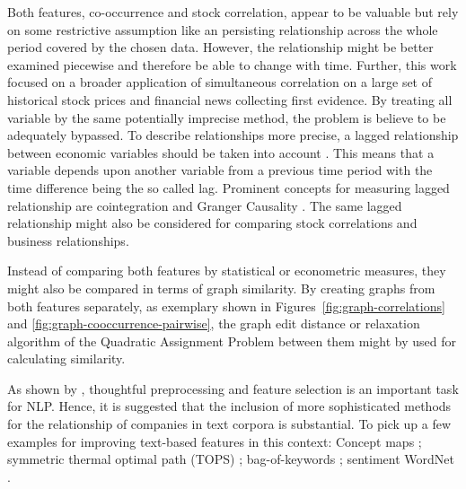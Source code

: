 Both features, co-occurrence and stock correlation, appear to be valuable but rely on some restrictive assumption like an  persisting relationship across the whole period covered by the chosen data. However, the relationship might be better examined piecewise and therefore be able to change with time. 
Further, this work focused on a broader application of simultaneous correlation on a large set of historical stock prices and financial news collecting first evidence. By treating all variable by the same potentially imprecise method, the problem is believe to be adequately bypassed. To describe relationships more precise, a lagged relationship between economic variables should be taken into account \cite{Kosapattarapim2017GrangerThailand}. This means that a variable depends upon another variable from a previous time period with the time difference being the so called lag. Prominent concepts for measuring lagged relationship are cointegration \cite{Engle1987Co-IntegrationTesting} and Granger Causality \cite{Granger1969InvestigatingMethods}. The same lagged relationship might also be considered for comparing stock correlations and business relationships.

Instead of comparing both features by statistical or econometric measures, they might also be compared in terms of graph similarity. By creating graphs from both features separately, as exemplary shown in Figures~\ref{fig:graph-correlations} and \ref{fig:graph-cooccurrence-pairwise}, the graph edit distance \cite{Koutra2016AlgorithmsMatching} or relaxation algorithm of the Quadratic Assignment Problem \cite{Carletti2016ExactRecognition} between them might by used for calculating similarity.



As shown by \citet{Ding2014UsingInvestigation}, thoughtful preprocessing and feature selection is an important task for NLP. Hence, it is suggested that the inclusion of more sophisticated methods for the relationship of companies in text corpora is substantial. To pick up a few examples for improving text-based features in this context: Concept maps \cite{Li2017DiscoveringCompanies}; symmetric thermal optimal path (TOPS) \cite{Meng2017SymmetricPolicies}; bag-of-keywords \cite{Peng2016LeverageNetworks}; sentiment WordNet \cite{Zhai2007CombiningPrediction, KhadjehNassirtoussi2015TextSentiment}.

